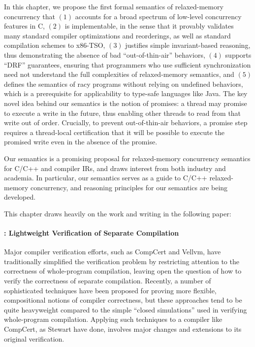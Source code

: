 In this chapter, we propose the first formal semantics of relaxed-memory concurrency that $(1)$
accounts for a broad spectrum of low-level concurrency features in C, $(2)$ is implementable, in the
sense that it provably validates many standard compiler optimizations and reorderings, as well as
standard compilation schemes to x86-TSO, $(3)$ justifies simple invariant-based reasoning, thus
demonstrating the absence of bad ``out-of-thin-air'' behaviors, $(4)$ supports ``DRF'' guarantees,
ensuring that programmers who use sufficient synchronization need not understand the full
complexities of relaxed-memory semantics, and $(5)$ defines the semantics of racy programs without
relying on undefined behaviors, which is a prerequisite for applicability to type-safe languages
like Java.  The key novel idea behind our semantics is the notion of promises: a thread may promise
to execute a write in the future, thus enabling other threads to read from that write out of order.
Crucially, to prevent out-of-thin-air behaviors, a promise step requires a thread-local
certification that it will be possible to execute the promised write even in the absence of the
promise.

  Our semantics is a promising proposal for relaxed-memory concurrency
semantics for C/C++ and compiler IRs, and draws interest from both industry and academia.  In
particular, our semantics serves as a guide to C/C++ relaxed-memory concurrency, and reasoning
principles for our semantics are being developed.

This chapter draws heavily on the work and writing in the following paper:



\paragraph{: Lightweight Verification of Separate Compilation}

Major compiler verification efforts, such as CompCert and Vellvm, have traditionally simplified the
verification problem by restricting attention to the correctness of whole-program compilation,
leaving open the question of how to verify the correctness of separate compilation.  Recently, a
number of sophisticated techniques have been proposed for proving more flexible, compositional
notions of compiler correctness, but these approaches tend to be quite heavyweight compared to the
simple ``closed simulations'' used in verifying whole-program compilation.  Applying such techniques
to a compiler like CompCert, as Stewart \etal{} have done, involves major changes and extensions to
its original verification.

